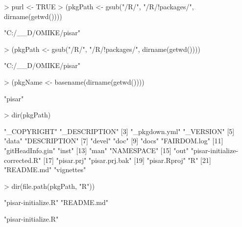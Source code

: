 \documentclass[a4paper,12pt]{article}\usepackage[]{graphicx}\usepackage[]{color}
\begin{document}
\begin{Schunk}
\begin{Sinput}
> purl <- TRUE
> (pkgPath <- gsub("/R/", "/R/!packages/", dirname(getwd())))
\end{Sinput}
\begin{Soutput}
[1] "C:/__D/OMIKE/pisar"
\end{Soutput}
\begin{Sinput}
> (pkgPath <- gsub("/R/", "/R/!packages/", dirname(getwd())))
\end{Sinput}
\begin{Soutput}
[1] "C:/__D/OMIKE/pisar"
\end{Soutput}
\begin{Sinput}
> (pkgName <- basename(dirname(getwd())))
\end{Sinput}
\begin{Soutput}
[1] "pisar"
\end{Soutput}
\begin{Sinput}
> dir(pkgPath)
\end{Sinput}
\begin{Soutput}
 [1] "_COPYRIGHT"                   "_DESCRIPTION"                
 [3] "_pkgdown.yml"                 "_VERSION"                    
 [5] "data"                         "DESCRIPTION"                 
 [7] "devel"                        "doc"                         
 [9] "docs"                         "FAIRDOM.log"                 
[11] "gitHeadInfo.gin"              "inst"                        
[13] "man"                          "NAMESPACE"                   
[15] "out"                          "pisar-initialize-corrected.R"
[17] "pisar.prj"                    "pisar.prj.bak"               
[19] "pisar.Rproj"                  "R"                           
[21] "README.md"                    "vignettes"                   
\end{Soutput}
\begin{Sinput}
> dir(file.path(pkgPath, "R"))
\end{Sinput}
\begin{Soutput}
[1] "pisar-initialize.R" "README.md"         
\end{Soutput}
\begin{Soutput}
[1] "pisar-initialize.R"
\end{Soutput}
\end{Schunk}
\end{document}
